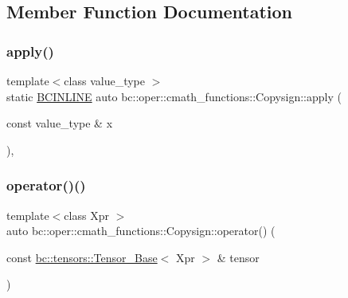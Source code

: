 \subsection{Member Function Documentation}
\mbox{\label{structbc_1_1oper_1_1cmath__functions_1_1Copysign_a0070bf204b95e6eabc100a53592bbd36}} 
\subsubsection{\texorpdfstring{apply()}{apply()}}
{\footnotesize\ttfamily template$<$class value\+\_\+type $>$ \\
static \hyperlink{common_8h_a6699e8b0449da5c0fafb878e59c1d4b1}{B\+C\+I\+N\+L\+I\+NE} auto bc\+::oper\+::cmath\+\_\+functions\+::\+Copysign\+::apply (\begin{DoxyParamCaption}\item[{const value\+\_\+type \&}]{x }\end{DoxyParamCaption})\hspace{0.3cm}{\ttfamily [inline]}, {\ttfamily [static]}}

\mbox{\label{structbc_1_1oper_1_1cmath__functions_1_1Copysign_aedd1cbd4c0e2b1a021b899ecf3a0964b}} 
\subsubsection{\texorpdfstring{operator()()}{operator()()}\hspace{0.1cm}{\footnotesize\ttfamily [1/3]}}
{\footnotesize\ttfamily template$<$class Xpr $>$ \\
auto bc\+::oper\+::cmath\+\_\+functions\+::\+Copysign\+::operator() (\begin{DoxyParamCaption}\item[{const \hyperlink{classbc_1_1tensors_1_1Tensor__Base}{bc\+::tensors\+::\+Tensor\+\_\+\+Base}$<$ Xpr $>$ \&}]{tensor }\end{DoxyParamCaption})\hspace{0.3cm}{\ttfamily [inline]}}

